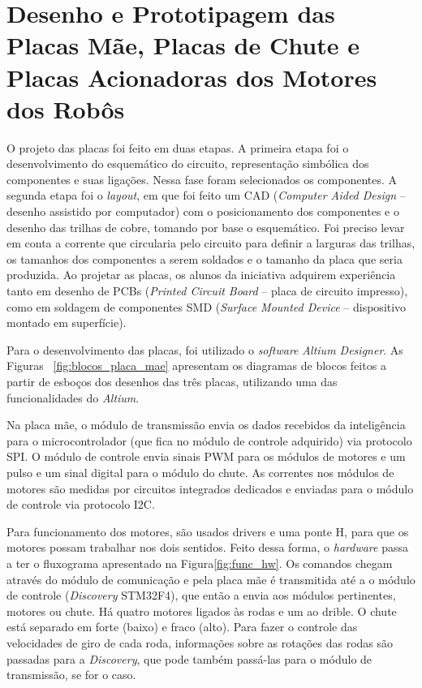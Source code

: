 \chapter{Desenho e Prototipagem das Placas Mãe, Placas de Chute e Placas Acionadoras dos Motores dos Robôs}\label{cap:design_placas}

O projeto das placas foi feito em duas etapas. A primeira etapa foi o desenvolvimento do esquemático do circuito, representação simbólica dos componentes e suas ligações. Nessa fase foram selecionados os componentes. A segunda etapa foi o \textit{layout}, em que foi feito um CAD (\textit{Computer Aided Design} ­– desenho assistido por computador) com o posicionamento dos componentes e o desenho das trilhas de cobre, tomando por base o esquemático. Foi preciso levar em conta a corrente que circularia pelo circuito para definir a larguras das trilhas, os tamanhos dos componentes a serem soldados e o tamanho da placa que seria produzida. Ao projetar as placas, os alunos da iniciativa adquirem experiência tanto em desenho de PCBs (\textit{Printed Circuit Board} – placa de circuito impresso), como em soldagem de componentes SMD (\textit{Surface Mounted Device} – dispositivo montado em superfície).

Para o desenvolvimento das placas, foi utilizado o \textit{software} \textit{Altium Designer\textsuperscript{\textregistered}}. As Figuras ~\ref{fig:blocos_placa_mae} apresentam os diagramas de blocos feitos a partir de esboços dos desenhos das três placas, utilizando uma das funcionalidades do \textit{Altium}.

Na placa mãe, o módulo de transmissão envia os dados recebidos da inteligência para o microcontrolador (que fica no módulo de controle adquirido) via protocolo SPI.
O módulo de controle envia sinais PWM para os módulos de motores e um pulso e um sinal digital para o módulo do chute. As correntes nos módulos de motores são medidas por circuitos integrados dedicados e enviadas para o módulo de controle via protocolo I2C.

Para funcionamento dos motores, são usados drivers e uma ponte H, para que os motores possam trabalhar nos dois sentidos.
Feito dessa forma, o \textit{hardware} passa a ter o fluxograma apresentado na Figura\ref{fig:func_hw}. Os comandos chegam através do módulo de comunicação e pela placa mãe é transmitida até a o módulo de controle (\textit{Discovery} STM32F4), que então a envia aos módulos pertinentes, motores ou chute. Há quatro motores ligados às rodas e um ao drible. O chute está separado em forte (baixo) e fraco (alto). Para fazer o controle das velocidades de giro de cada roda, informações sobre as rotações das rodas são passadas para a \textit{Discovery}, que pode também passá-las para o módulo de transmissão, se for o caso.

